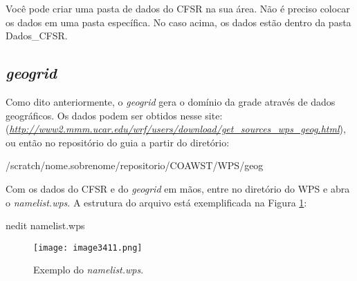 \begin{tcolorbox}[enhanced,
  grow to left by=0cm,%
  grow to right by=0cm,%
  enlarge top by=0cm,%
  enlarge bottom by=0cm,%
  tcbox raise base,
  boxrule=1.0pt,
  left=18mm,
  colframe=red!50!black,coltext=red!25!black,colback=red!10!white,
  overlay={\begin{tcbclipinterior}\fill[red!75!blue!50!white] (frame.south west)
    rectangle node[text=white,font=\sffamily\bfseries\footnotesize,rotate=0] {ATENÇÃO} ([xshift=18mm]frame.north west);\end{tcbclipinterior}}]
Você pode criar uma pasta de dados do CFSR na sua área. Não é preciso colocar os dados em uma pasta específica. No caso acima, os dados estão dentro da pasta Dados\_CFSR.
\end{tcolorbox}
\bigskip

\subsection{\textit{geogrid}}\label{geowps}
\bigskip

\noindent Como dito anteriormente, o \textit{geogrid} gera o domínio da grade através de dados geográficos. Os dados podem ser obtidos nesse site: (\textcolor{bleu_cite}{\href{http://www2.mmm.ucar.edu/wrf/users/download/get\_sources\_wps\_geog.html}{\textit{http://www2.mmm.ucar.edu/wrf/users/download/get\_sources\_wps\_geog.html}}}), ou então no repositório do guia a partir do diretório:
\bigskip

\begin{bashcode}
/scratch/nome.sobrenome/repositorio/COAWST/WPS/geog
\end{bashcode}
\bigskip

\noindent Com os dados do CFSR e do \textit{geogrid} em mãos, entre no diretório do WPS e abra o \textit{namelist.wps}. A estrutura do arquivo está exemplificada na Figura \textcolor{bleu_cite}{\ref{namelistwps}}:
\bigskip

\begin{bashcode}
nedit namelist.wps
\end{bashcode}
\bigskip

\begin{figure}[H]
    \centering
    \texttt{[image: image3411.png]}
    \caption{Exemplo do \textit{namelist.wps}.}
    \label{namelistwps}
\end{figure}
\bigskip

